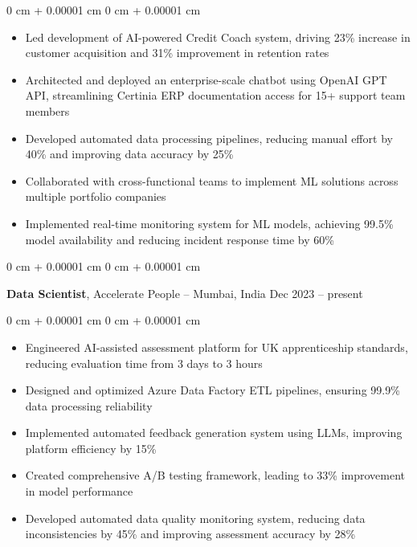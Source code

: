 \documentclass[10pt, letterpaper]{article}
\newenvironment{highlights}{
    \begin{itemize}[
        topsep=0.12 cm,
        parsep=0.12 cm,
        partopsep=0pt,
        itemsep=0pt,
        leftmargin=0 cm + 10pt
    ]
}{
    \end{itemize}
} %
\newenvironment{onecolentry}{
    \begin{adjustwidth}{
        0 cm + 0.00001 cm
    }{
        0 cm + 0.00001 cm
    }
}{
    \end{adjustwidth}
} %
\newenvironment{twocolentry}[2][]{
    \onecolentry
    \def\secondColumn{#2}
    \setcolumnwidth{\fill, 4.2 cm}
    \begin{paracol}{2}
}{
    \switchcolumn \raggedleft \secondColumn
    \end{paracol}
    \endonecolentry
} %
\begin{document}
        \vspace{0.12 cm}
        \begin{onecolentry}
            \begin{highlights}
                \item Led development of AI-powered Credit Coach system, driving 23\% increase in customer acquisition and 31\% improvement in retention rates
                \item Architected and deployed an enterprise-scale chatbot using OpenAI GPT API, streamlining Certinia ERP documentation access for 15+ support team members
                \item Developed automated data processing pipelines, reducing manual effort by 40\% and improving data accuracy by 25\%
                \item Collaborated with cross-functional teams to implement ML solutions across multiple portfolio companies
                \item Implemented real-time monitoring system for ML models, achieving 99.5\% model availability and reducing incident response time by 60\%
            \end{highlights}
        \end{onecolentry}


        \vspace{0.15 cm}

        \begin{twocolentry}{
            Dec 2023 – present
        }
            \textbf{Data Scientist}, Accelerate People -- Mumbai, India\end{twocolentry}

        \vspace{0.12 cm}
        \begin{onecolentry}
            \begin{highlights}
                \item Engineered AI-assisted assessment platform for UK apprenticeship standards, reducing evaluation time from 3 days to 3 hours
                \item Designed and optimized Azure Data Factory ETL pipelines, ensuring 99.9\% data processing reliability
                \item Implemented automated feedback generation system using LLMs, improving platform efficiency by 15\%
                \item Created comprehensive A/B testing framework, leading to 33\% improvement in model performance
                \item Developed automated data quality monitoring system, reducing data inconsistencies by 45\% and improving assessment accuracy by 28\%
            \end{highlights}
        \end{onecolentry}
\end{document}
